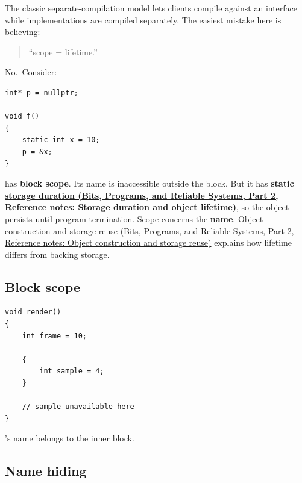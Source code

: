 The classic separate-compilation model lets clients compile against an interface while implementations are compiled separately. The easiest mistake here is believing:

\begin{quote}
``scope = lifetime.''
\end{quote}

No.~Consider:

\begin{verbatim}
int* p = nullptr;

void f()
{
    static int x = 10;
    p = &x;
}
\end{verbatim}

 has \textbf{block scope}. Its name  is inaccessible outside the block. But it has \textbf{static \href{../01-Bits-Programs-and-Reliable-Systems-P02/main.pdf\#appendix-0b104bcba06b}{storage duration (Bits, Programs, and Reliable Systems, Part 2, Reference notes: Storage duration and object lifetime)}}, so the object persists until program termination. Scope concerns the \textbf{name}. \href{../01-Bits-Programs-and-Reliable-Systems-P02/main.pdf\#appendix-a82f9c438857}{Object construction and storage reuse (Bits, Programs, and Reliable Systems, Part 2, Reference notes: Object construction and storage reuse)} explains how lifetime differs from backing storage.

\subsection{Block scope}\label{05-engine-i-ch002-block-scope}

\hypertarget{05-engine-i-ch002-block-scope}{}

\begin{verbatim}
void render()
{
    int frame = 10;

    {
        int sample = 4;
    }

    // sample unavailable here
}
\end{verbatim}

's name belongs to the inner block.

\subsection{Name hiding}\label{05-engine-i-ch002-name-hiding}

\hypertarget{05-engine-i-ch002-name-hiding}{}


